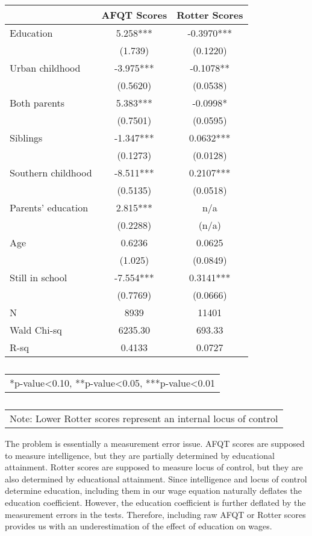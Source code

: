 \documentclass[12pt]{report}
\newcommand{\prbf}[1]{\textbf{#1}}
\begin{document}
\begin{table}
\caption{
\label{tab:test}}
\vspace{2pt}
\centering\begin{tabular}{l|c|c}
\hline
\hline
& \prbf{AFQT Scores} & \prbf{Rotter Scores}\\
\hline
Education & 5.258*** & -0.3970***\\
& (1.739) & (0.1220)\\
Urban childhood & -3.975*** & -0.1078**\\
& (0.5620) & (0.0538)\\
Both parents & 5.383*** & -0.0998*\\
& (0.7501) & (0.0595)\\
Siblings & -1.347*** & 0.0632***\\
& (0.1273) & (0.0128)\\
Southern childhood & -8.511*** & 0.2107***\\
& (0.5135) & (0.0518)\\
Parents' education & 2.815*** & n/a\\
& (0.2288) & (n/a)\\
Age & 0.6236 & 0.0625\\
& (1.025) & (0.0849)\\
Still in school & -7.554*** & 0.3141***\\
& (0.7769) & (0.0666)\\
\hline
N & 8939 & 11401\\
Wald Chi-sq & 6235.30 & 693.33\\
R-sq & 0.4133 & 0.0727\\
\hline
\hline
\end{tabular}
\begin{tabular}{p{6.25in}}\footnotesize{
*p-value<0.10, **p-value<0.05, ***p-value<0.01}\\
\end{tabular}
\begin{tabular}{p{6.25in}}\footnotesize{
Note: Lower Rotter scores represent an internal locus of control}\\
\end{tabular}
\end{table}


The problem is essentially a measurement error issue. AFQT scores are supposed to measure intelligence, but they are partially determined by educational attainment. Rotter scores are supposed to measure locus of control, but they are also determined by educational attainment. Since intelligence and locus of control determine education, including them in our wage equation naturally deflates the education coefficient. However, the education coefficient is further deflated by the measurement errors in the tests. Therefore, including raw AFQT or Rotter scores provides us with an underestimation of the effect of education on wages.
\end{document}
